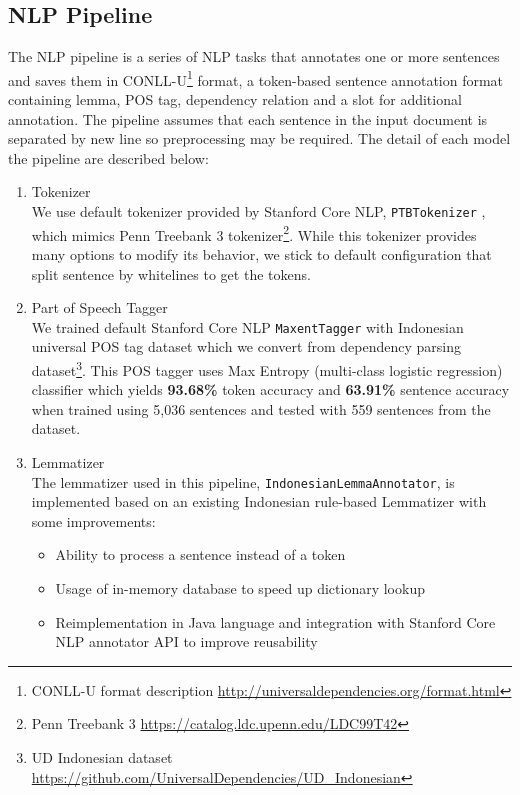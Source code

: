 \subsection{NLP Pipeline}

The NLP pipeline is a series of NLP tasks that annotates one or more sentences and saves them in CONLL-U\footnote{CONLL-U format description \url{http://universaldependencies.org/format.html}} format, a token-based sentence annotation format containing lemma, POS tag, dependency relation and a slot for additional annotation. The pipeline assumes that each sentence in the input document is separated by new line so preprocessing may be required. The detail of each model the pipeline are described below:

\begin{enumerate}

\item Tokenizer \\
We use default tokenizer provided by Stanford Core NLP, \verb|PTBTokenizer| \citep{manningptbtokenizer}, which mimics Penn Treebank 3 tokenizer\footnote{Penn Treebank 3 \url{https://catalog.ldc.upenn.edu/LDC99T42}}. While this tokenizer provides many options to modify its behavior, we stick to default configuration that split sentence by whitelines to get the tokens.\\

\item Part of Speech Tagger \\
We trained default Stanford Core NLP \verb|MaxentTagger| \citep{toutanova2003feature} with Indonesian universal POS tag dataset which we convert from dependency parsing dataset\footnote{UD Indonesian dataset \url{https://github.com/UniversalDependencies/UD_Indonesian}}. This POS tagger uses Max Entropy (multi-class logistic regression) classifier which yields \textbf{93.68\%} token accuracy and \textbf{63.91\%} sentence accuracy when trained using 5,036 sentences and tested with 559 sentences from the dataset. \\

\item Lemmatizer \\
The lemmatizer used in this pipeline, \verb|IndonesianLemmaAnnotator|, is implemented based on an existing Indonesian rule-based Lemmatizer \citep{suhartono2014lemmatization} with some improvements:

\begin{itemize}
\item Ability to process a sentence instead of a token
\item Usage of in-memory database to speed up dictionary lookup
\item Reimplementation in Java language and integration with Stanford Core NLP annotator API to improve reusability
\end{itemize}


\end{enumerate}
